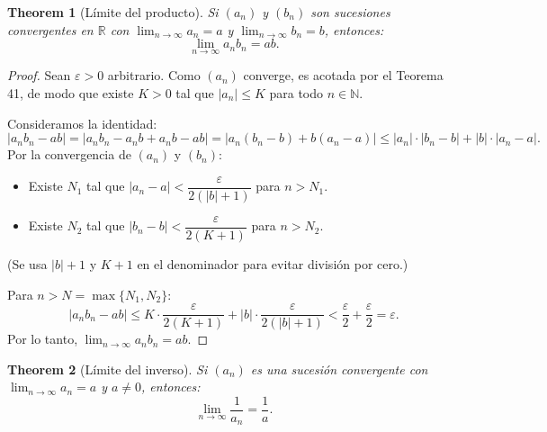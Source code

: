 \documentclass[11pt,a4paper]{article}
\theoremstyle{plain}
\newtheorem{theorem}{Theorem}[section]
\theoremstyle{definition}
\begin{document}

\begin{theorem}[Límite del producto]
Si $(a_n)$ y $(b_n)$ son sucesiones convergentes en $\mathbb{R}$ con $\lim_{n\to\infty} a_n = a$ y $\lim_{n\to\infty} b_n = b$, entonces:
\[
\lim_{n\to\infty} a_n b_n = ab.
\]
\end{theorem}

\begin{proof}
Sean $\varepsilon > 0$ arbitrario. Como $(a_n)$ converge, es acotada por el Teorema 41, de modo que existe $K > 0$ tal que $|a_n| \leq K$ para todo $n \in \mathbb{N}$.

Consideramos la identidad:
\[
|a_n b_n - ab| = |a_n b_n - a_n b + a_n b - ab| = |a_n(b_n - b) + b(a_n - a)| \leq |a_n| \cdot |b_n - b| + |b| \cdot |a_n - a|.
\]
Por la convergencia de $(a_n)$ y $(b_n)$:
\begin{itemize}
    \item Existe $N_1$ tal que $|a_n - a| < \dfrac{\varepsilon}{2(|b| + 1)}$ para $n > N_1$.
    \item Existe $N_2$ tal que $|b_n - b| < \dfrac{\varepsilon}{2(K + 1)}$ para $n > N_2$.
\end{itemize}
(Se usa $|b|+1$ y $K+1$ en el denominador para evitar división por cero.)

Para $n > N = \max\{N_1, N_2\}$:
\[
|a_n b_n - ab| \leq K \cdot \frac{\varepsilon}{2(K + 1)} + |b| \cdot \frac{\varepsilon}{2(|b| + 1)} < \frac{\varepsilon}{2} + \frac{\varepsilon}{2} = \varepsilon.
\]
Por lo tanto, $\lim_{n\to\infty} a_n b_n = ab$.
\end{proof}


\begin{theorem}[Límite del inverso]
Si $(a_n)$ es una sucesión convergente con $\lim_{n\to\infty} a_n = a$ y $a \neq 0$, entonces:
\[
\lim_{n\to\infty} \frac{1}{a_n} = \frac{1}{a}.
\]
\end{theorem}
\end{document}
